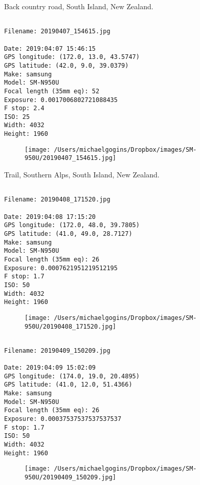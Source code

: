 \clearpage
\onecolumn
\noindent Back country road, South Island, New Zealand.
\noindent
\begin{lstlisting}

Filename: 20190407_154615.jpg

Date: 2019:04:07 15:46:15
GPS longitude: (172.0, 13.0, 43.5747)
GPS latitude: (42.0, 9.0, 39.0379)
Make: samsung
Model: SM-N950U
Focal length (35mm eq): 52
Exposure: 0.0017006802721088435
F stop: 2.4
ISO: 25
Width: 4032
Height: 1960
\end{lstlisting}
\clearpage

\begin{figure}
\texttt{[image: /Users/michaelgogins/Dropbox/images/SM-950U/20190407\_154615.jpg]}
\end{figure}
    
\clearpage
\onecolumn
\noindent Trail, Southern Alps, South Island, New Zealand.
\noindent
\begin{lstlisting}

Filename: 20190408_171520.jpg

Date: 2019:04:08 17:15:20
GPS longitude: (172.0, 48.0, 39.7805)
GPS latitude: (41.0, 49.0, 28.7127)
Make: samsung
Model: SM-N950U
Focal length (35mm eq): 26
Exposure: 0.0007621951219512195
F stop: 1.7
ISO: 50
Width: 4032
Height: 1960
\end{lstlisting}
\clearpage

\begin{figure}
\texttt{[image: /Users/michaelgogins/Dropbox/images/SM-950U/20190408\_171520.jpg]}
\end{figure}
    
\clearpage
\onecolumn
\noindent 
\noindent
\begin{lstlisting}

Filename: 20190409_150209.jpg

Date: 2019:04:09 15:02:09
GPS longitude: (174.0, 19.0, 20.4895)
GPS latitude: (41.0, 12.0, 51.4366)
Make: samsung
Model: SM-N950U
Focal length (35mm eq): 26
Exposure: 0.00037537537537537537
F stop: 1.7
ISO: 50
Width: 4032
Height: 1960
\end{lstlisting}
\clearpage

\begin{figure}
\texttt{[image: /Users/michaelgogins/Dropbox/images/SM-950U/20190409\_150209.jpg]}
\end{figure}
    
